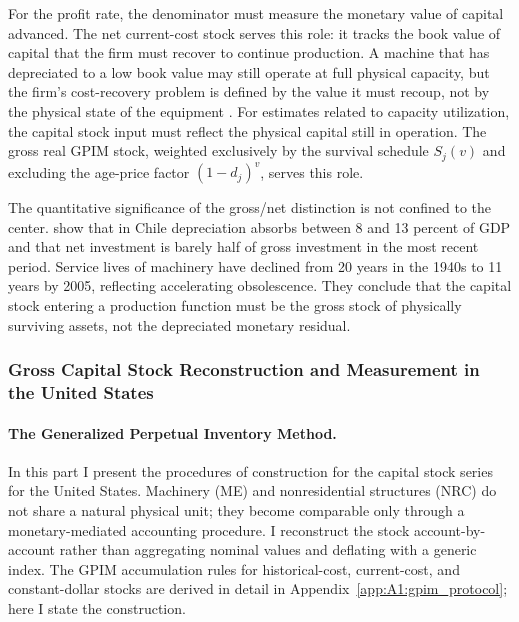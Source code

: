 For the profit rate, the denominator must measure the monetary value
of capital advanced. The net current-cost stock serves this role: it
tracks the book value of capital that the firm must recover to
continue production. A machine that has depreciated to a low book
value may still operate at full physical capacity, but the firm's
cost-recovery problem is defined by the value it must recoup, not by
the physical state of the equipment \citep{Basu2013}. For estimates
related to capacity utilization, the capital stock input must reflect
the physical capital still in operation. The gross real GPIM stock,
weighted exclusively by the survival schedule $S_j(v)$ and excluding
the age-price factor $(1-d_j)^v$, serves this role.

The quantitative significance of the gross/net distinction is not
confined to the center. \citet{Ffrench2016} show that in Chile
depreciation absorbs between 8 and 13 percent of GDP and that net
investment is barely half of gross investment in the most recent
period. Service lives of machinery have declined from 20 years in
the 1940s to 11 years by 2005, reflecting accelerating obsolescence.
They conclude that the capital stock entering a production function
must be the gross stock of physically surviving assets, not the
depreciated monetary residual.

\subsubsection{Gross Capital Stock Reconstruction and Measurement in the United States}
\label{sec:412:us_capital}

\paragraph{The Generalized Perpetual Inventory Method.}
In this part I present the procedures of construction for 
the capital stock series for the United States. Machinery (ME) and nonresidential structures (NRC) do not
share a natural physical unit; they become comparable only through a
monetary-mediated accounting procedure. I reconstruct the stock
account-by-account rather than aggregating nominal values and
deflating with a generic index. The GPIM accumulation rules for
historical-cost, current-cost, and constant-dollar stocks
\citep[App.~6.5]{Shaikh2016} are derived in detail in
Appendix~\ref{app:A1:gpim_protocol}; here I state the construction.

